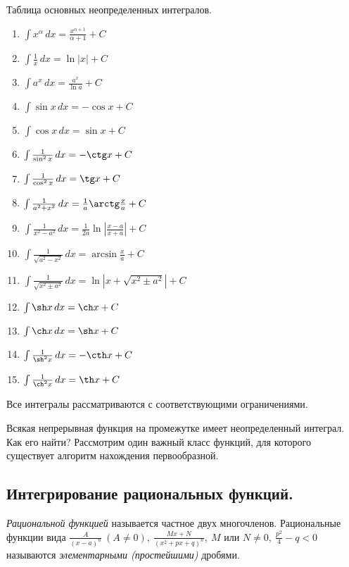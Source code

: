 \begin{note}
Таблица основных неопределенных интегралов.
\begin{enumerate}
    \item $\int x^{\alpha} \,dx = \frac{x^{\alpha + 1}}{\alpha + 1} + C$
    \item $\int \frac{1}{x} \,dx = \ln|x| + C$
    \item $\int a^{x} \, dx = \frac{a^{x}}{\ln a}+ C$
    \item $\int \sin x \, dx = - \cos x + C$
    \item $\int \cos x \, dx = \sin x + C$
    \item $\int \frac{1}{\sin^{2} x} \, dx = - \ctg x + C$
    \item $\int \frac{1}{\cos^{2} x} \, dx = \tg x + C$
    \item $\int \frac{1}{a^2 + x^2} \, dx = \frac{1}{a} \arctg \frac{x}{a} + C$
    \item $\int \frac{1}{x^2 - a^2} \, dx = \frac{1}{2a} \ln |\frac{x - a}{x + a}|+ C$
    \item $\int \frac{1}{\sqrt{a^2 - x^2}} \, dx = \arcsin \frac{x}{a} + C$
    \item $\int \frac{1}{\sqrt{x^2 \pm a^2}} \, dx = \ln |x + \sqrt{x^2 \pm a^2}| + C$
    \item $\int \sh x \, dx = \ch x + C$
    \item $\int \ch x \, dx = \sh x + C$
    \item $\int \frac{1}{\sh^2 x} \, dx = - \cth x + C$
    \item $\int \frac{1}{\ch^2 x} \, dx = \th x + C$
\end{enumerate}
Все интегралы рассматриваются с соответствующими ограничениями.
\end{note}

Всякая непрерывная функция на промежутке имеет неопределенный интеграл. Как его найти? Рассмотрим один важный класс функций, для которого существует алгоритм нахождения первообразной.

\subsection{Интегрирование рациональных функций.}

\begin{definition}
    \textit{Рациональной функцией} называется частное двух многочленов.
    Рациональные функции вида $\frac{A}{(x-a)^{n}} \ (A \neq 0), \ \frac{Mx + N}{(x^{2} + px + q)^{n}}, \  M \text{ или } N \neq 0, \  \frac{p^2}{4} - q < 0$
    называются \textit{элементарными (простейшими)} дробями.
\end{definition}


